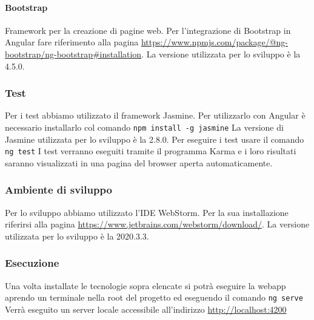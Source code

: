 \paragraph{Bootstrap}
Framework per la creazione di pagine web.
Per l'integrazione di Bootstrap in Angular fare riferimento alla pagina \url{https://www.npmjs.com/package/@ng-bootstrap/ng-bootstrap#installation}. La versione utilizzata per lo sviluppo è la 4.5.0.

\subsubsection{Test}
Per i test abbiamo utilizzato il framework Jasmine. Per utilizzarlo con Angular è necessario installarlo col comando \newline
	\texttt{npm install -g jasmine} \newline
La versione di Jasmine utilizzata per lo sviluppo è la 2.8.0. \newline
Per eseguire i test usare il comando \newline
	\texttt{ng test} \newline
I test verranno eseguiti tramite il programma Karma e i loro risultati saranno visualizzati in una pagina del browser aperta automaticamente.

\subsubsection{Ambiente di sviluppo}
Per lo sviluppo abbiamo utilizzato l'IDE WebStorm. Per la sua installazione riferirsi alla pagina \url{https://www.jetbrains.com/webstorm/download/}. La versione utilizzata per lo sviluppo è la 2020.3.3.

\subsubsection{Esecuzione}
Una volta installate le tecnologie sopra elencate si potrà eseguire la webapp aprendo un terminale nella root del progetto ed eseguendo il comando \newline
	\texttt{ng serve} \newline
Verrà eseguito un server locale accessibile all'indirizzo \url{http://localhost:4200}


